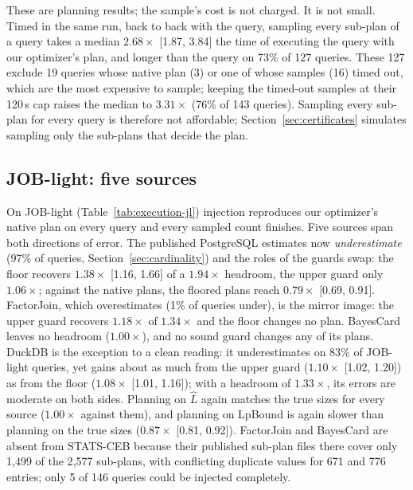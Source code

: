 \documentclass[sigconf, nonacm]{acmart}
\begin{document}
These are planning results; the sample's cost is not charged. It is not small.
Timed in the same run, back to back with the query, sampling every sub-plan of
a query takes a median $2.68\times$ [1.87, 3.84] the time of executing the query
with our optimizer's plan, and longer than the query on 73\% of 127 queries.
These 127 exclude 19 queries whose native plan (3) or one of whose samples (16)
timed out, which are the most expensive to sample; keeping the timed-out
samples at their 120\,s cap raises the median to $3.31\times$ (76\% of 143
queries). Sampling every sub-plan for every query is therefore not affordable;
Section~\ref{sec:certificates} simulates sampling only the sub-plans that decide
the plan.

\subsection{JOB-light: five sources}
On JOB-light (Table~\ref{tab:execution-jl}) injection reproduces our
optimizer's native plan on every query and every sampled count finishes. Five
sources span both directions of error. The published PostgreSQL estimates now
\emph{underestimate} (97\% of queries, Section~\ref{sec:cardinality}) and the
roles of the guards swap: the floor recovers $1.38\times$ [1.16, 1.66] of a
$1.94\times$ headroom, the upper guard only $1.06\times$; against the native
plans, the floored plans reach $0.79\times$ [0.69, 0.91]. FactorJoin, which
overestimates (1\% of queries under), is the mirror image: the upper guard
recovers $1.18\times$ of $1.34\times$ and the floor changes no plan. BayesCard
leaves no headroom ($1.00\times$), and no sound guard changes any of its plans.
DuckDB is the exception to a clean reading: it underestimates on 83\% of
JOB-light queries, yet gains about as much from the upper guard
($1.10\times$ [1.02, 1.20]) as from the floor ($1.08\times$ [1.01, 1.16]);
with a headroom of $1.33\times$, its errors are moderate on both sides.
Planning on $\hat L$ again matches the true sizes for every source
($1.00\times$ against them), and planning on LpBound is again slower than
planning on the true sizes ($0.87\times$ [0.81, 0.92]). FactorJoin and
BayesCard are absent from STATS-CEB because their published sub-plan files
there cover only 1{,}499 of the 2{,}577 sub-plans, with conflicting duplicate
values for 671 and 776 entries; only 5 of 146 queries could be injected
completely.
\end{document}
